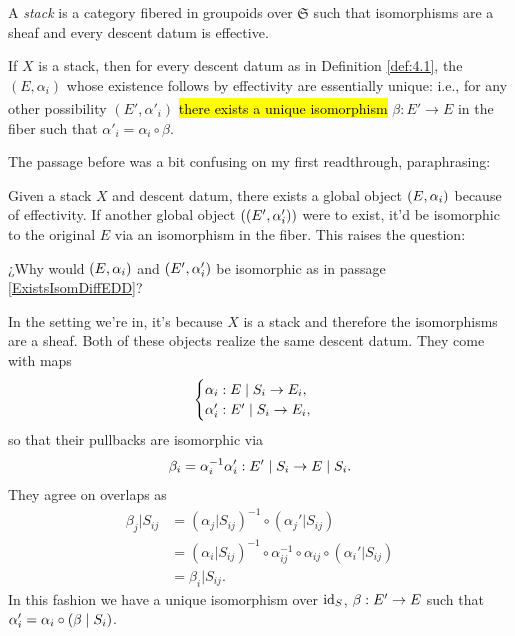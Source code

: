 \documentclass[12pt]{memoir}
\makeatletter
\newcommand{\roundedhighlight}[1]{%
  \begingroup
  \setuloverlap{2pt}%
  \def\SOUL@ulunderline##1{{%
    \setbox\z@\hbox{##1}%
    \rlap{\SOUL@ulcolor{\tikz[overlay,blend mode=darken]{%
      \fill[rounded corners=2pt]
        (-\SOUL@uloverlap,-\SOUL@uldp)
        rectangle (\dimexpr\wd\z@+\SOUL@uloverlap\relax,\SOUL@ulht);%
    }}}%
    \unhcopy\z@
  }}%
  \hl{#1}%
  \endgroup
}
\DeclareRobustCommand{\hlblue}[1]{{\sethlcolor{noteblue}\roundedhighlight{#1}}}
\newcounter{passage}
\newcommand{\passagemark}{%
  \refstepcounter{passage}%
  \textsuperscript{\normalfont[\thepassage]}%
}
\makeatother
\begin{document}
\begin{Def}\label{def:4.3}
A \emph{stack} is a category fibered in groupoids over $\mathfrak{S}$ such that isomorphisms are a sheaf and every descent datum is effective.
\end{Def}

If $X$ is a stack, then for every descent datum as in Definition \ref{def:4.1}, the $(E, \alpha_i)$ whose existence follows by effectivity are essentially unique: i.e., for any other possibility $(E', \alpha'_i)$ \hlblue{there exists a unique isomorphism}\passagemark\label{ExistsIsomDiffEDD} $\beta\colon E' \to E$ in the fiber such that $\alpha'_i = \alpha_i \circ \beta$.

\begin{ptcb}
   The passage before was a bit confusing on my first readthrough, paraphrasing:\par
   Given a stack \(X\) and descent datum, there exists a global object \((E,\alpha_i)\) because of effectivity. If another global object \(((E',\alpha_i'))\) were to exist, it'd be isomorphic to the original \(E\) via an isomorphism in the fiber. This raises the question:

   \begin{Qn}
    ¿Why would \((E,\alpha_i)\) and \((E',\alpha_i')\) be isomorphic as in passage \ref{ExistsIsomDiffEDD}?
   \end{Qn}

   In the setting we're in, it's because \(X\) is a stack and therefore the isomorphisms are a sheaf. Both of these objects realize the same descent datum. They come with maps 
   \[
   \begin{cases}
    \al_i: E\mid S_i\to E_i,\\
    \al_i': E'\mid S_i\to E_i,
   \end{cases}
   \]
   so that their pullbacks are isomorphic via
   \[
    \bt_i=\al_i^{-1}\al_i':E'\mid S_i\to E\mid S_i.
   \]
   They agree on overlaps as
   \[
        \begin{aligned}
            \beta_j|S_{ij}&=(\alpha_j|S_{ij})^{-1}\circ(\alpha_j'|S_{ij})\\
            &=(\alpha_i|S_{ij})^{-1}
            \circ\alpha_{ij}^{-1}\circ\alpha_{ij}
            \circ(\alpha_i'|S_{ij})\\
            &=\beta_i|S_{ij}.
        \end{aligned}
    \]
    In this fashion we have a unique isomorphism over \(\operatorname{id}_S\), \(\beta:E'\to E\) such that \(\al_i'=\al_i\circ (\bt\mid S_i)\). 
\end{ptcb}
\end{document}
